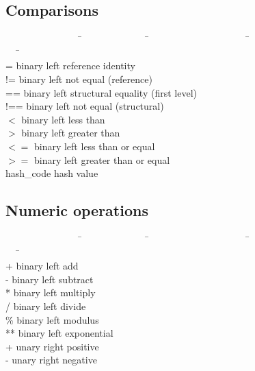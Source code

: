 \documentclass[11pt]{mybook}
\begin{document}
\subsection{Comparisons}
\label{lisaac_world:glossary:comparisons}
\begin{tabbing}
~~~~~~~~~~~~~~~~\=~~~~~~~~~~~~~~\=~~~~~~~~~~~~~~~~~~~~~\=~~~~~~~~~~~~~~~~~~~~~~~~\=\kill\\
{=}             \> binary \>left  \> {reference identity}                \\
{!=}            \> binary \>left  \> {not equal (reference)}             \\
{==}            \> binary \>left  \> {structural equality (first level)} \\
{!==}           \> binary \>left  \> {not equal (structural)}            \\
{$<$}           \> binary \>left  \> {less than}             \\
{$>$}           \> binary \>left  \> {greater than}          \\
{$<=$}          \> binary \>left  \> {less than or equal}    \\
{$>=$}          \> binary \>left  \> {greater than or equal} \\
{hash\_code}    \>        \>      \> {hash value}            \\
\end{tabbing}
\subsection{Numeric operations}
\label{lisaac_world:glossary:numeric_operations}
\begin{tabbing}
~~~~~~~~~~~~~~~~\=~~~~~~~~~~~~~~\=~~~~~~~~~~~~~~~~~~~~~\=~~~~~~~~~~~~~~~~~~~~~~~~\=\kill\\
{+}             \> binary \>left  \> {add}                   \\
{-}             \> binary \>left  \> {subtract}              \\
{*}             \> binary \>left  \> {multiply}              \\
{/}             \> binary \>left  \> {divide}                \\
{\%}            \> binary \>left  \> {modulus}               \\
{**}            \> binary \>left  \> {exponential}           \\
{+}             \> unary  \>right \> {positive}              \\
{-}             \> unary  \>right \> {negative}              \\
\end{tabbing}
\end{document}
